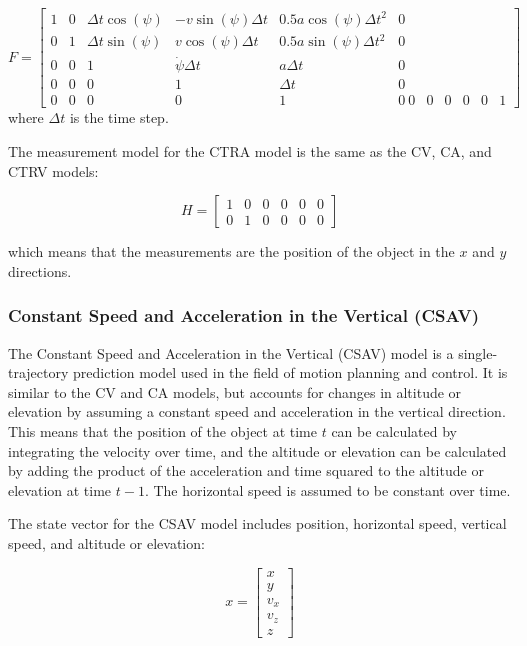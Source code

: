 \begin{equation}
	F = \begin{bmatrix}
		1 & 0 & \Delta t\cos(\psi) & -v\sin(\psi)\Delta t & 0.5a\cos(\psi)\Delta t^2 & 0 \\
		0 & 1 & \Delta t\sin(\psi) & v\cos(\psi)\Delta t & 0.5a\sin(\psi)\Delta t^2 & 0 \\
		0 & 0 & 1 & \dot{\psi}\Delta t & a\Delta t & 0 \\ 
		0 & 0 & 0 & 1 & \Delta t & 0 \\ 
		0 & 0 & 0 & 0 & 1 & 0 \ 0 & 0 & 0 & 0 & 0 & 1
	\end{bmatrix}
\end{equation}
where $\Delta t$ is the time step.

The measurement model for the CTRA model is the same as the CV, CA, and CTRV models:

\begin{equation}
	H = \begin{bmatrix}
		1 & 0 & 0 & 0 & 0 & 0 \\ 
		0 & 1 & 0 & 0 & 0 & 0
	\end{bmatrix}
\end{equation}

which means that the measurements are the position of the object in the $x$ and $y$ directions.

\subsubsection{Constant Speed and Acceleration in the Vertical (CSAV)}
\label{subsubsec:3_CSAV}

The Constant Speed and Acceleration in the Vertical (CSAV) model is a single-trajectory prediction model used in the field of motion planning and control. It is similar to the CV and CA models, but accounts for changes in altitude or elevation by assuming a constant speed and acceleration in the vertical direction. This means that the position of the object at time $t$ can be calculated by integrating the velocity over time, and the altitude or elevation can be calculated by adding the product of the acceleration and time squared to the altitude or elevation at time $t-1$. The horizontal speed is assumed to be constant over time.

The state vector for the CSAV model includes position, horizontal speed, vertical speed, and altitude or elevation:

\begin{equation}
	x = \begin{bmatrix}
		x \\ 
		y \\ 
		v_x \\ 
		v_z \\ 
		z
	\end{bmatrix}
\end{equation}

